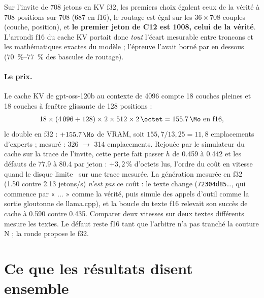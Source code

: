 Sur l'invite de 708 jetons en KV f32, les premiers choix égalent ceux de la vérité à 708 positions sur 708 (687 en f16), le routage est égal sur les $36 \times 708$ couples (couche, position), et \textbf{le premier jeton de C12 est 1008, celui de la vérité}. L'arrondi f16 du cache KV portait donc \emph{tout} l'écart mesurable entre troncons et les mathématiques exactes du modèle ; l'épreuve l'avait borné par en dessous (\SIrange{70}{77}{\percent} des bascules de routage).

\paragraph{Le prix.} Le cache KV de gpt-oss-120b au contexte de \num{4096} compte 18 couches pleines et 18 couches à fenêtre glissante de 128 positions :
\[
18 \times (4\,096 + 128) \times 2 \times 512 \times \SI{2}{\octet} = \SI{155.7}{\Mo} \text{ en f16},
\]
le double en f32 : $+\SI{155.7}{\Mo}$ de VRAM, soit $155{,}7 / 13{,}25 = 11{,}8$ emplacements d'experts \calc ; mesuré : 326 $\to$ 314 emplacements. Rejouée par le simulateur du cache sur la trace de l'invite, cette perte fait passer $h$ de \num{0.459} à \num{0.442} et les défauts de \num{77.9} à \num{80.4} par jeton : $+3{,}2\,\%$ d'octets lus, l'ordre du coût en vitesse quand le disque limite \calc~sur une trace mesurée. La génération mesurée en f32 (\num{1.50} contre \num{2.13} jetons/s) \emph{n'est pas} ce coût : le texte change (\texttt{72304d85}…, qui commence par « ... » comme la vérité, puis simule des appels d'outil comme la sortie gloutonne de llama.cpp), et la boucle du texte f16 relevait son succès de cache à \num{0.590} contre \num{0.435}. Comparer deux vitesses sur deux textes différents mesure les textes. Le défaut reste f16 tant que l'arbitre n'a pas tranché la couture N ; la ronde propose le f32.

\section{Ce que les résultats disent ensemble}\label{t2res-sec:ensemble}

